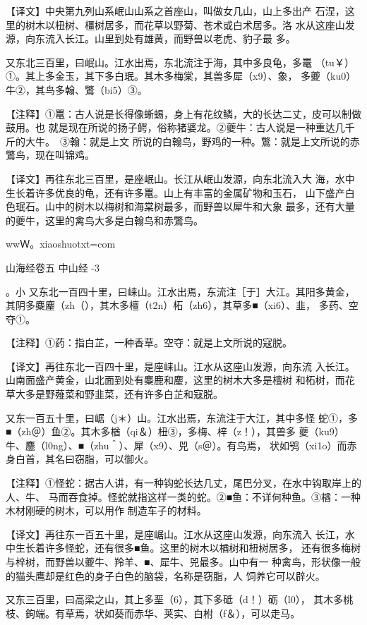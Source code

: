 \documentclass[a4paper,12pt,UTF8,twoside]{ctexbook}
\begin{document}
【译文】中央第九列山系岷山山系之首座山，叫做女几山，山上多出产 石涅，这里的树木以杻树、橿树居多，而花草以野菊、苍术或白术居多。洛 水从这座山发源，向东流入长江。山里到处有雄黄，而野兽以老虎、豹子最 多。

又东北三百里，曰岷山。江水出焉，东北流注于海，其中多良龟，多鼍 （tu￥）①。其上多金玉，其下多白珉。其木多梅棠，其兽多犀（x9）、象， 多夔（ku0）牛②，其鸟多翰、鷩（bi5）③。

【注释】①鼍：古人说是长得像蜥蜴，身上有花纹鳞，大的长达二丈，皮可以制做鼓用。也 就是现在所说的扬子鳄，俗称猪婆龙。②夔牛：古人说是一种重达几千斤的大牛。　③翰：就是上文 所说的白翰鸟，野鸡的一种。鷩：就是上文所说的赤鷩鸟，现在叫锦鸡。

【译文】再往东北三百里，是座岷山。长江从岷山发源，向东北流入大 海，水中生长着许多优良的龟，还有许多鼍。山上有丰富的金属矿物和玉石， 山下盛产白色珉石。山中的树木以梅树和海棠树最多，而野兽以犀牛和大象 最多，还有大量的夔牛，这里的禽鸟大多是白翰鸟和赤鷩鸟。

wwＷ。xiaoshuotxt=com



山海经卷五 中山经 -3

。小%
又东北一百四十里，曰崃山。江水出焉，东流注［于］大江。其阳多黄金， 其阴多麋麈（zh（），其木多檀（t2n）柘（zh6），其草多■（xi6）、韭， 多药、空夺①。

【注释】①药：指白芷，一种香草。空夺：就是上文所说的寇脱。

【译文】再往东北一百四十里，是座崃山。江水从这座山发源，向东流 入长江。山南面盛产黄金，山北面到处有麋鹿和麈，这里的树木大多是檀树 和柘树，而花草大多是野薤菜和野韭菜，还有许多白芷和寇脱。

又东一百五十里，曰崌（j＊）山。江水出焉，东流注于大江，其中多怪 蛇①，多■（zh＠）鱼②。其木多楢（qi＆）杻③，多梅、梓（z！），其兽多 夔（ku9）牛、麢（l0ng）、■（zhu＾）、犀（x9）、兕（s＠）。有鸟焉， 状如鸮（xi1o）而赤身白首，其名曰窃脂，可以御火。

【注释】①怪蛇：据古人讲，有一种钩蛇长达几丈，尾巴分叉，在水中钩取岸上的人、牛、 马而吞食掉。怪蛇就指这样一类的蛇。②■鱼：不详何种鱼。③楢：一种木材刚硬的树木，可以用作 制造车子的材料。

【译文】再往东一百五十里，是座崌山。江水从这座山发源，向东流入 长江，水中生长着许多怪蛇，还有很多■鱼。这里的树木以楢树和杻树居多， 还有很多梅树与梓树，而野兽以夔牛、羚羊、■、犀牛、兕最多。山中有一 种禽鸟，形状像一般的猫头鹰却是红色的身子白色的脑袋，名称是窃脂，人 饲养它可以辟火。

又东三百里，曰高梁之山，其上多垩（6），其下多砥（d！）砺（l0）， 其木多桃枝、鉤端。有草焉，状如葵而赤华、荚实、白柎（f＆），可以走马。
\end{document}
